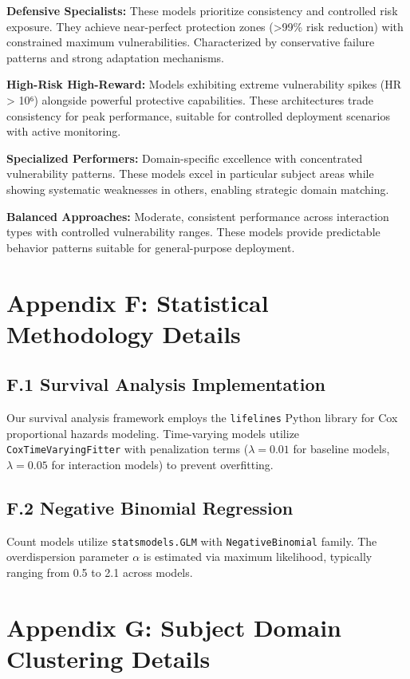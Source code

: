 \documentclass[letterpaper]{article}
\begin{document}
\textbf{Defensive Specialists:} These models prioritize consistency and controlled risk exposure. They achieve near-perfect protection zones (>99\% risk reduction) with constrained maximum vulnerabilities. Characterized by conservative failure patterns and strong adaptation mechanisms.

\textbf{High-Risk High-Reward:} Models exhibiting extreme vulnerability spikes (HR > 10⁶) alongside powerful protective capabilities. These architectures trade consistency for peak performance, suitable for controlled deployment scenarios with active monitoring.

\textbf{Specialized Performers:} Domain-specific excellence with concentrated vulnerability patterns. These models excel in particular subject areas while showing systematic weaknesses in others, enabling strategic domain matching.

\textbf{Balanced Approaches:} Moderate, consistent performance across interaction types with controlled vulnerability ranges. These models provide predictable behavior patterns suitable for general-purpose deployment.

\section*{Appendix F: Statistical Methodology Details}
\label{app:methodology}

\subsection*{F.1 Survival Analysis Implementation}

Our survival analysis framework employs the \texttt{lifelines} Python library for Cox proportional hazards modeling. Time-varying models utilize \texttt{CoxTimeVaryingFitter} with penalization terms ($\lambda = 0.01$ for baseline models, $\lambda = 0.05$ for interaction models) to prevent overfitting.

\subsection*{F.2 Negative Binomial Regression}

Count models utilize \texttt{statsmodels.GLM} with \texttt{NegativeBinomial} family. The overdispersion parameter $\alpha$ is estimated via maximum likelihood, typically ranging from 0.5 to 2.1 across models.

\section*{Appendix G: Subject Domain Clustering Details}
\label{app:subject_mapping}
\end{document}
